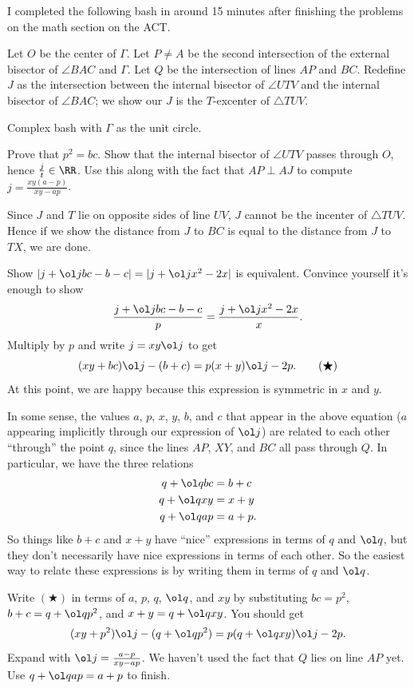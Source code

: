 \documentclass[11pt]{scrartcl}
\begin{document}
\begin{walkthrough}
	I completed the following bash in around 15 minutes after finishing the problems on the math section on the ACT.

	Let $O$ be the center of $\Gamma$. Let $P \neq A$ be the second intersection of the external bisector of $\angle BAC$ and $\Gamma$. Let $Q$ be the intersection of lines $AP$ and $BC$. Redefine $J$ as the intersection between the internal bisector of $\angle UTV$ and the internal bisector of $\angle BAC$; we show our $J$ is the $T$-excenter of $\triangle TUV$.

	Complex bash with $\Gamma$ as the unit circle.

	\begin{walk}
		\ii Prove that $p^2 = bc$.
		\ii Show that the internal bisector of $\angle UTV$ passes through $O$, hence $\frac jt \in \RR$. Use this along with the fact that $AP \perp AJ$ to compute $j = \frac{xy(a - p)}{xy - ap}$.
	\end{walk}

	Since $J$ and $T$ lie on opposite sides of line $UV$, $J$ cannot be the incenter of $\triangle TUV$. Hence if we show the distance from $J$ to $BC$ is equal to the distance from $J$ to $TX$, we are done.

	\begin{walk}[resume]
		\ii Show $\lvert j + \ol jbc - b - c\rvert = \lvert j + \ol jx^2 - 2x\rvert$ is equivalent.
		\ii Convince yourself it's enough to show
		\[\frac{j + \ol jbc - b - c}p = \frac{j + \ol jx^2 - 2x}x.\]
		\ii Multiply by $p$ and write $j = xy\ol j$ to get
		\[(xy + bc)\ol j - (b + c) = p(x + y)\ol j - 2p. \tag{$\bigstar$}\]
		At this point, we are happy because this expression is symmetric in $x$ and $y$.
	\end{walk}

	In some sense, the values $a$, $p$, $x$, $y$, $b$, and $c$ that appear in the above equation ($a$ appearing implicitly through our expression of $\ol j$) are related to each other ``through'' the point $q$, since the lines $AP$, $XY$, and $BC$ all pass through $Q$. In particular, we have the three relations
	\begin{align*}
		q + \ol qbc &= b + c \\
		q + \ol qxy &= x + y \\
		q + \ol qap &= a + p.
	\end{align*}
	So things like $b + c$ and $x + y$ have ``nice'' expressions in terms of $q$ and $\ol q$, but they don't necessarily have nice expressions in terms of each other. So the easiest way to relate these expressions is by writing them in terms of $q$ and $\ol q$.

	\begin{walk}[resume]
		\ii Write $(\bigstar)$ in terms of $a$, $p$, $q$, $\ol q$, and $xy$ by substituting $bc = p^2$, $b + c = q + \ol qp^2$, and $x + y = q + \ol qxy$. You should get
		\[(xy + p^2)\ol j - (q + \ol qp^2) = p(q + \ol qxy)\ol j - 2p.\]
		\ii Expand with $\ol j = \frac{a - p}{xy - ap}$.
		\ii We haven't used the fact that $Q$ lies on line $AP$ yet. Use $q + \ol qap = a + p$ to finish.
	\end{walk}
\end{walkthrough}
\end{document}

